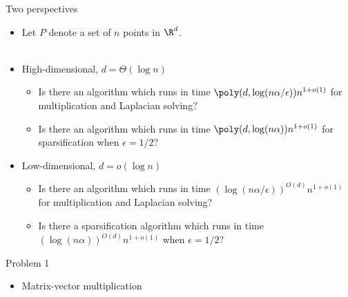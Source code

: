 

\begin{frame}{Two perspectives}

\begin{itemize}
  \item <+-> Let $P$ denote a set of $n$ points in $\R^d$. \\ \\
	\item <+-> High-dimensional, $d = \Theta(\log n)$
	\begin{itemize}
		\item <+-> Is there an algorithm which runs in time $\poly(d, \log(n\alpha/\epsilon)) n^{1+o(1)}$ for multiplication and Laplacian solving? 
		\item <+-> Is there an algorithm which runs in time $\poly(d, \log(n\alpha))n^{1+o(1)}$ for sparsification when $\epsilon=1/2$?
	\end{itemize}
	\item <+-> Low-dimensional,  $d = o(\log n)$
	\begin{itemize}
		\item <+-> Is there an algorithm which runs in time $(\log(n\alpha/\epsilon))^{O(d)} n^{1+o(1)}$ for multiplication and Laplacian solving?
		\item <+-> Is there a sparsification algorithm which runs in time $(\log(n\alpha))^{O(d)} n^{1+o(1)}$ when $\epsilon=1/2$?
	\end{itemize}
\end{itemize}

\end{frame}

\begin{frame}{Problem 1}

\begin{itemize}
	\item Matrix-vector multiplication
\end{itemize}

\end{frame}

